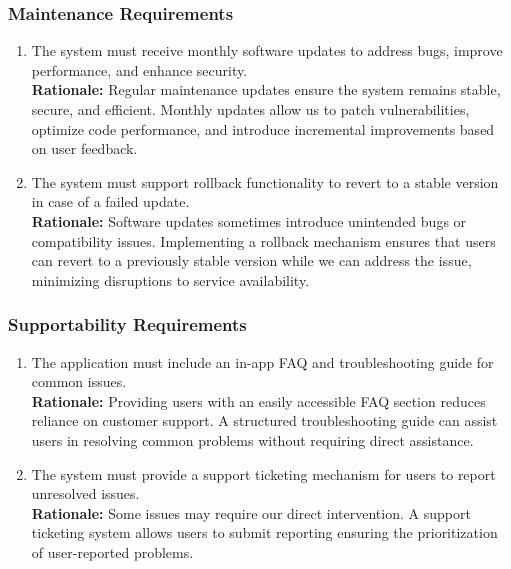 \documentclass[]{article}
\begin{document}
\subsubsection{Maintenance Requirements}
\label{ssub:maintenance_requirements}
\begin{enumerate}[label={MS-M\arabic*.}]
    \item The system must receive monthly software updates to address bugs, improve performance, and enhance security.\\
   \textbf{Rationale:} Regular maintenance updates ensure the system remains stable, secure, and efficient. Monthly updates allow us to patch vulnerabilities, optimize code performance, and introduce incremental improvements based on user feedback.
   \item The system must support rollback functionality to revert to a stable version in case of a failed update.\\
   \textbf{Rationale:} Software updates sometimes introduce unintended bugs or compatibility issues. Implementing a rollback mechanism ensures that users can revert to a previously stable version while we can address the issue, minimizing disruptions to service availability.

\end{enumerate}

\subsubsection{Supportability Requirements}
\label{ssub:supportability_requirements}
\begin{enumerate}[label={MS-S\arabic*.}]
    \item The application must include an in-app FAQ and troubleshooting guide for common issues.\\
   \textbf{Rationale:} Providing users with an easily accessible FAQ section reduces reliance on customer support. A structured troubleshooting guide can assist users in resolving common problems without requiring direct assistance.
   \item The system must provide a support ticketing mechanism for users to report unresolved issues.\\
   \textbf{Rationale:} Some issues may require our direct intervention. A support ticketing system allows users to submit reporting ensuring the prioritization of user-reported problems.
\end{enumerate}
\end{document}
